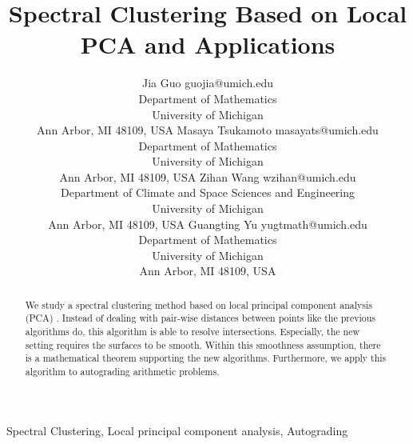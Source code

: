 \documentclass[twoside,11pt]{article}
\begin{document}
\title{Spectral Clustering Based on Local PCA and Applications}

\author{
\name Jia Guo \email guojia@umich.edu \\
\addr Department of Mathematics\\
University of Michigan\\
Ann Arbor, MI 48109, USA
\AND
\name Masaya Tsukamoto \email masayats@umich.edu \\
\addr Department of Mathematics\\
University of Michigan\\
Ann Arbor, MI 48109, USA
\AND
\name Zihan Wang \email wzihan@umich.edu \\
\addr Department of Climate and Space Sciences and Engineering\\
University of Michigan\\
Ann Arbor, MI 48109, USA
\AND
\name Guangting Yu \email yugtmath@umich.edu \\
\addr Department of Mathematics\\
University of Michigan\\
Ann Arbor, MI 48109, USA
}


\maketitle

\begin{abstract}
We study a spectral clustering method based on local principal component analysis (PCA) \citep{arias2017}.
Instead of dealing with pair-wise distances between points like the previous algorithms do, this algorithm is able to resolve intersections.
Especially, the new setting requires the surfaces to be smooth.
Within this smoothness assumption, there is a mathematical theorem supporting the new algorithms.
Furthermore, we apply this algorithm to autograding arithmetic problems.
\end{abstract}

\begin{keywords}
Spectral Clustering, Local principal component analysis, Autograding
\end{keywords}


\end{document}
